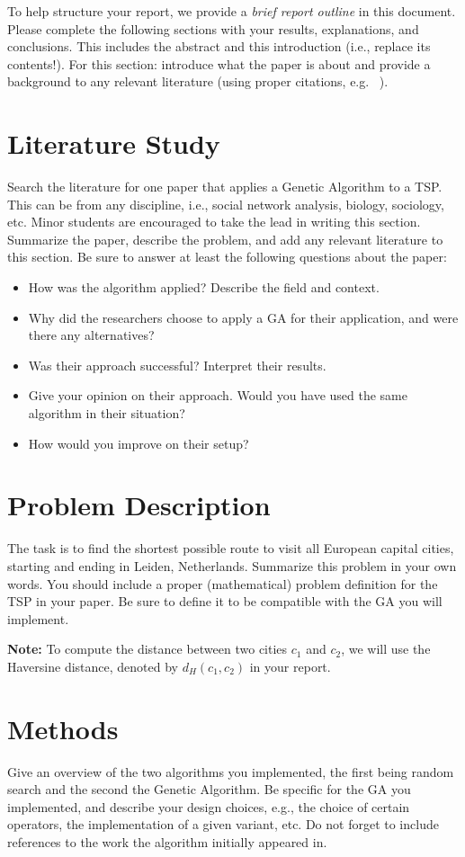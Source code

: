 \documentclass[runningheads]{llncs}
\begin{document}
To help structure your report, we provide a \textit{brief report outline} in this document. Please complete the following sections with your results, explanations, and conclusions. This includes the abstract and this introduction (i.e., replace its contents!). For this section: introduce what the paper is about and provide a background to any relevant literature (using proper citations, e.g. ~\cite{holland1992genetic}).

\section{Literature Study}
Search the literature for one paper that applies a Genetic Algorithm to a TSP. This can be from any discipline, i.e., social network analysis, biology, sociology, etc. Minor students are encouraged to take the lead in writing this section.
Summarize the paper, describe the problem, and add any relevant literature to this section. Be
sure to answer at least the following questions about the paper:
\begin{itemize}
    \item How was the algorithm applied? Describe the field and context.
    \item Why did the researchers choose to apply a GA for their application, and were there any
alternatives?
    \item Was their approach successful? Interpret their results.
    \item Give your opinion on their approach. Would you have used the same algorithm in their
situation?
    \item How would you improve on their setup?
\end{itemize}

\section{Problem Description}\label{sect:descr}
The task is to find the shortest possible route to visit all European capital cities, starting and ending in Leiden, Netherlands. Summarize this problem in your own words. You should include a proper (mathematical) problem definition for the TSP in your paper. Be sure to define it to be compatible with the GA you will implement. 

\textbf{Note:} To compute the distance between two cities $c_1$ and $c_2$, we will use the Haversine distance, denoted by $d_H(c_1, c_2)$ in your report. 

\section{Methods}\label{sect:impl}
Give an overview of the two algorithms you implemented, the first being random search and the second the Genetic Algorithm. Be specific for the GA you implemented, and describe
your design choices, e.g., the choice of certain operators, the implementation of a given variant, etc. Do not forget to include references to the work the algorithm initially appeared in. 
\end{document}
